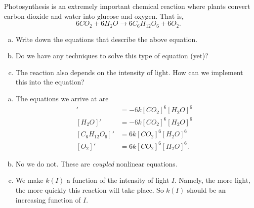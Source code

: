 \documentclass[12pt]{article} %
\begin{document}
\begin{problem}
    Photosynthesis is an extremely important chemical reaction where plants convert carbon dioxide and water into glucose and oxygen. That is,
    \[
        6CO_2 + 6H_2O \to 6C_6 H_{12} O_6 + 6 O_2.
    \]
    \begin{enumerate}[(a)]
        \item Write down the equations that describe the above equation.
        \item Do we have any techniques to solve this type of equation (yet)?
        \item The reaction also depends on the intensity of light.  How can we implement this into the equation?
    \end{enumerate}   
\end{problem}
\begin{solution}
    \begin{enumerate}[(a)]
        \item The equations we arrive at are
        \begin{align*}
            [CO_2]' &= -6k [CO_2]^6[H_2 O]^6\\
            [H_2O]' &= -6 k[CO_2]^6[H_2 O]^6\\
            [C_6 H_{12} O_6]' &= 6 k[CO_2]^6[H_2 O]^6\\
            [O_2]' &= 6 k[CO_2]^6[H_2 O]^6.
        \end{align*}
        \item No we do not.  These are \emph{coupled} nonlinear equations.

        \item We make $k(I)$ a function of the intensity of light $I$.  Namely, the more light, the more quickly this reaction will take place.  So $k(I)$ should be an increasing function of $I$.
    \end{enumerate}
\end{solution}

\newpage
\end{document}
